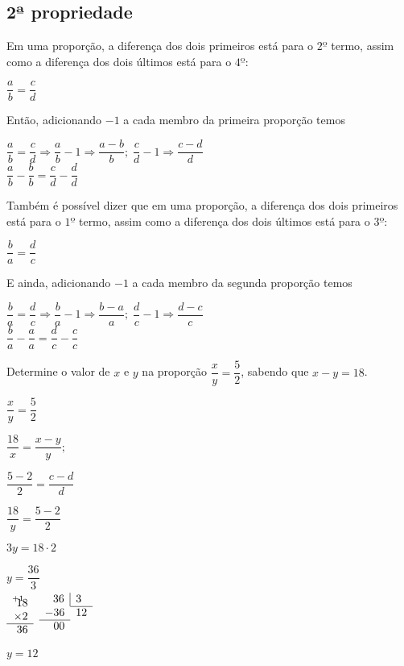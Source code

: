 \begin{enumerate}
\subsection{2ª propriedade}
Em uma proporção, a diferença dos dois primeiros está para o $ 2º $ termo, assim como a diferença dos dois últimos está para o $ 4º $:


$ \dfrac{a}{b} = \dfrac{c}{d} $

Então, adicionando $ -1 $ a cada membro da primeira proporção temos

$ \dfrac{a}{b} = \dfrac{c}{d} \Rightarrow \dfrac{a}{b} - 1 \Rightarrow \dfrac{a-b}{b}; \; \dfrac{c}{d} - 1 \Rightarrow \dfrac{c-d}{d}$\\

$ \dfrac{a}{b} - \dfrac{b}{b} = \dfrac{c}{d} - \dfrac{d}{d}$

Também é possível dizer que em uma proporção, a diferença dos dois primeiros está para o $ 1º $ termo, assim como a diferença dos dois últimos está para o $ 3º $:

$ \dfrac{b}{a} = \dfrac{d}{c} $

E ainda, adicionando $ -1 $ a cada membro da segunda proporção temos

$ \dfrac{b}{a} = \dfrac{d}{c} \Rightarrow \dfrac{b}{a} - 1 \Rightarrow \dfrac{b-a}{a}; \; \dfrac{d}{c} - 1 \Rightarrow \dfrac{d-c}{c}$\\

$ \dfrac{b}{a} - \dfrac{a}{a} = \dfrac{d}{c} - \dfrac{c}{c}$

Determine o valor de $ x $ e $ y $ na proporção $ \dfrac{x}{y} = \dfrac{5}{2} $, sabendo que $ x-y = 18 $.

\begin{multicols}{5}
	$ \dfrac{x}{y} = \dfrac{5}{2}$
	
	\columnbreak
	$\dfrac{18}{x} = \dfrac{x-y}{y};$
	
	$ \dfrac{5-2}{2} = \dfrac{c-d}{d}$
	
	\columnbreak
	$ \dfrac{18}{y} = \dfrac{5-2}{2} $
	
	$ 3y = 18 \cdot 2 $
	
	$ y = \dfrac{36}{3} $\\
	\columnbreak
	$
	\begin{array}{r r}
	\multicolumn{2}{l}{_{+1}} \vspace*{-5.5pt} \\
	\multicolumn{2}{r}{18} \\ 
	\multicolumn{2}{r}{\times2} \\ \cline{1-2}
	\multicolumn{2}{r}{36} \\
	\end{array}
	$
	\columnbreak
	$
	\begin{array}{r r r r}
	\multicolumn{2}{r}{36} \vline & \multicolumn{2}{l}{3} \\ \cline{3-4}
	\multicolumn{2}{l}{-36} & \multicolumn{2}{l}{12} \\ \cline{1-2}
	\multicolumn{2}{r}{00} &  \\
	\end{array}
	$
\end{multicols}
$ y = 12 $


\end{enumerate}
